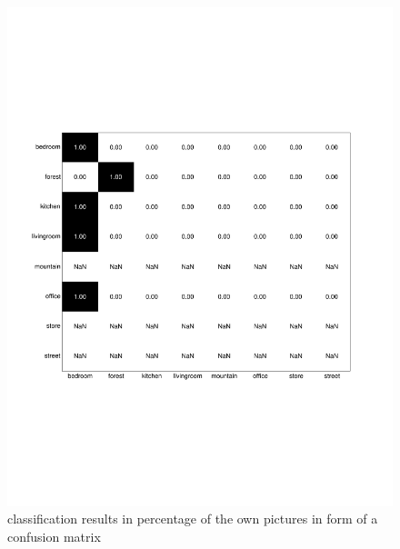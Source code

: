\documentclass[subfigure,epsfig,fleqn,float,numbers=noenddot]{scrartcl}
\begin{document}
\begin{figure}
		\centering
		\includegraphics[width=\textwidth]{img/conf_matrix_own.pdf}
		\caption{classification results in percentage of the own pictures in form of a confusion matrix}
		\label{fig:conf_matrix_own}
\end{figure}
\end{document}
